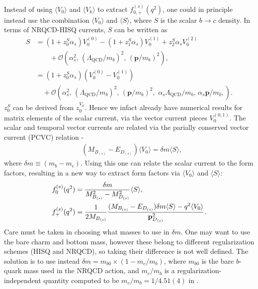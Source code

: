 Instead of using $\langle V_0 \rangle$ and $\langle V_k \rangle$ to extract $f^{(s)}_{0,+}(q^2)$, one could in principle instead use the combination $\langle V_0 \rangle$ and $\langle S \rangle$, where $S$ is the scalar $b\to c$ density. In terms of NRQCD-HISQ currents, $S$ can be written as
\begin{align}
  S &= (1+z_0^S\alpha_s)V^{(0)}_0 - (1+z_1^S\alpha_s)V^{(1)}_0 + z_2^S\alpha_sV_0^{(2)}\\ \nonumber &\quad\quad + \mathcal{O}(\alpha_s^2,\, (\Lambda_{\text{QCD}}/m_b)^2,\, ({\textbf{p}}/m_b)^2 ), \\
  &= (1+z_0^S\alpha_s)( V^{(0)}_0 - V_0^{(1)} )  \\ \nonumber &\quad + \mathcal{O}(\alpha_s^2,\, (\Lambda_{\text{QCD}}/m_b)^2,\, ({\textbf{p}}/m_b)^2,\,\, \alpha_s \Lambda_{\text{QCD}} / m_b,\, \alpha_s {\textbf{p}}/m_b, ).
\end{align}
$z_0^S$ can be derived from $z_0^{V_{\mu}}$. Hence we infact already have numerical results for matrix elements of the scalar current, via the vector current pieces $V^{(0,1)}_0$. The scalar and temporal vector currents are related via the parially conserved vector current (PCVC) relation -
\begin{align}
  &(M_{B_{(s)}}-E_{D_{(s)}})\langle V_0 \rangle = \delta m \langle S \rangle,
\end{align}
where $\delta m \equiv (m_b-m_c)$. Using this one can relate the scalar current to the form factors, resulting in a new way to extract form factors via $\langle V_0 \rangle$ and $\langle S \rangle$:
\begin{align}
  f_0^{(s)}(q^2) &= {\delta m\over M_{B_{(s)}}^2 - M_{D_{(s)}}^2 } \langle S \rangle, \\
  f_+^{(s)}(q^2) &= {1\over 2M_{B_{(s)}}} { (M_{B_{(s)}}-E_{D_{(s)}}) \delta m \langle S \rangle - q^2 \langle V_0 \rangle \over {\bf{p}}^2_{D_{(s)}}}. \label{eq:fplus_badness}
\end{align}
Care must be taken in choosing what masses to use in $\delta m$. One may want to use the bare charm and bottom mass, however these belong to different regularization schemes (HISQ and NRQCD), so taking their difference is not well defined. The solution is to use instead $\delta m = m_{b0} \times ( 1 - m_c/m_b)$, where $m_{b0}$ is the bare $b$-quark mass used in the NRQCD action, and $m_c/m_b$ is a regularization-independent quantity computed to be $m_c/m_b = 1/4.51(4)$ in \cite{McNeile:2010ji}.

